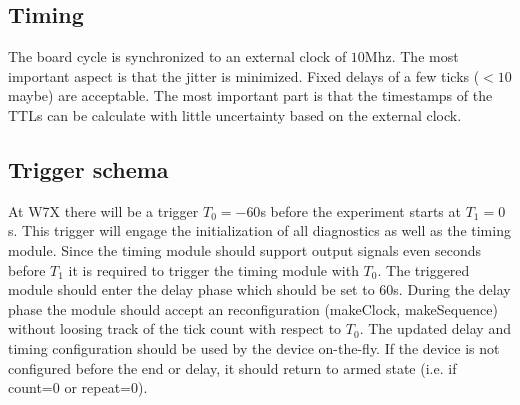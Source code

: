 \documentclass{article}
\begin{document}
\subsection*{Timing}
The board cycle is synchronized to an external clock of $10$Mhz.
The most important aspect is that the jitter is minimized. Fixed delays of a few ticks ($<10$ maybe) are acceptable. The most important part is that the timestamps of the TTLs can be calculate with little uncertainty based on the external clock.

\subsection*{Trigger schema}
At W7X there will be a trigger $T_0=-60$s before the experiment starts at $T_1=0$s. This trigger will engage the initialization of all diagnostics as well as the timing module. Since the timing module should support output signals even seconds before $T_1$ it is required to trigger the timing module with $T_0$. The triggered module should enter the delay phase which should be set to $60$s. During the delay phase the module should accept an reconfiguration (makeClock, makeSequence) without loosing track of the tick count with respect to $T_0$. The updated delay and timing configuration should be used by the device on-the-fly. If the device is not configured before the end or delay, it should return to armed state (i.e. if count=0 or repeat=0).

\clearpage\thispagestyle{empty}
\end{document}
